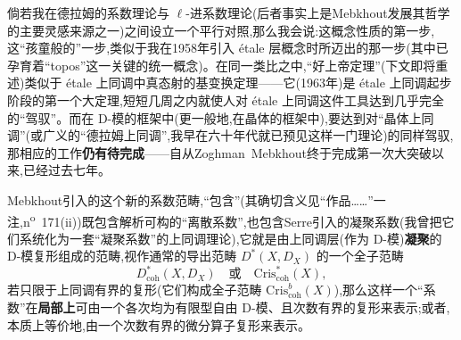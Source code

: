 \noindent 倘若我在德拉姆的系数理论与 $\ell$-进系数理论(后者事实上是Mebkhout发展其哲学的主要灵感来源之一)之间设立一个平行对照,那么我会说:这概念性质的第一步,这“孩童般的”一步,类似于我在1958年引入 étale 层概念时所迈出的那一步(其中已孕育着“topos”这一关键的统一概念)。在同一类比之中,“好上帝定理”(下文即将重述)类似于 étale 上同调中真态射的基变换定理——它(1963年)是 étale 上同调起步阶段的第一个大定理,短短几周之内就使人对 étale 上同调这件工具达到几乎完全的“驾驭”。而在 D-模的框架中(更一般地,在晶体的框架中),要达到对“晶体上同调”(或广义的“德拉姆上同调”,我早在六十年代就已预见这样一门理论)的同样驾驭,那相应的工作\textbf{仍有待完成}——自从Zoghman~Mebkhout终于完成第一次大突破以来,已经过去七年。

\noindent Mebkhout引入的这个新的系数范畴,“包含”(其确切含义见“作品……”一注,n\textsuperscript{o}~171(ii))既包含解析可构的“离散系数”,也包含Serre引入的凝聚系数(我曾把它们系统化为一套“凝聚系数”的上同调理论),它就是由上同调层(作为 D-模)\textbf{凝聚}的 D-模复形组成的范畴,视作通常的导出范畴 $D^{*}(X,D_{X})$ 的一个全子范畴
\begin{equation*}
D^{*}_{\mathrm{coh}}(X,D_{X}) \quad \text{或} \quad \mathrm{Cris}^{*}_{\mathrm{coh}}(X),
\tag{3}
\end{equation*}
若只限于上同调有界的复形(它们构成全子范畴 $\mathrm{Cris}^{b}_{\mathrm{coh}}(X)$),那么这样一个“系数”在\textbf{局部上}可由一个各次均为有限型自由 D-模、且次数有界的复形来表示;或者,本质上等价地,由一个次数有界的微分算子复形来表示。

